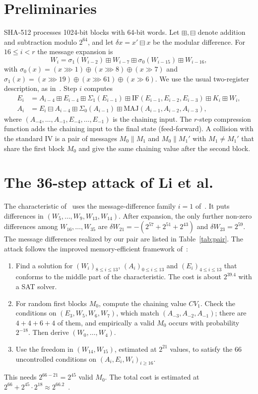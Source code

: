 \documentclass[11pt]{article}
\begin{document}
\section{Preliminaries}

SHA-512 processes 1024-bit blocks with 64-bit words. Let $\boxplus,\boxminus$ denote addition and subtraction modulo $2^{64}$, and let $\delta x = x'\boxminus x$ be the modular difference. For $16\le i<r$ the message expansion is
\[
W_i = \sigma_1(W_{i-2}) \boxplus W_{i-7} \boxplus \sigma_0(W_{i-15}) \boxplus W_{i-16},
\]
with $\sigma_0(x)=(x\ggg 1)\oplus(x\ggg 8)\oplus(x\gg 7)$ and $\sigma_1(x)=(x\ggg 19)\oplus(x\ggg 61)\oplus(x\gg 6)$. We use the usual two-register description, as in~\cite{LZLLQZ26}. Step $i$ computes
\begin{align*}
E_i &= A_{i-4} \boxplus E_{i-4} \boxplus \Sigma_1(E_{i-1}) \boxplus \mathrm{IF}(E_{i-1},E_{i-2},E_{i-3}) \boxplus K_i \boxplus W_i,\\
A_i &= E_i \boxminus A_{i-4} \boxplus \Sigma_0(A_{i-1}) \boxplus \mathrm{MAJ}(A_{i-1},A_{i-2},A_{i-3}),
\end{align*}
where $(A_{-4},\dots,A_{-1},E_{-4},\dots,E_{-1})$ is the chaining input. The $r$-step compression function adds the chaining input to the final state (feed-forward). A collision with the standard IV is a pair of messages $M_0\|M_1$ and $M_0\|M_1'$ with $M_1\neq M_1'$ that share the first block $M_0$ and give the same chaining value after the second block.

\section{The 36-step attack of Li et al.}\label{sec:prior}

The characteristic of~\cite[Tables~12--13]{LZLLQZ26} uses the message-difference family $i=1$ of~\cite{LLWS26}. It puts differences in $(W_5,\dots,W_9,W_{13},W_{14})$. After expansion, the only further non-zero differences among $W_{16},\dots,W_{35}$ are $\delta W_{21}=-(2^{57}+2^{51}+2^{43})$ and $\delta W_{23}=2^{59}$. The message differences realized by our pair are listed in Table~\ref{tab:pair}. The attack follows the improved memory-efficient framework of~\cite{LLWS26}:
\begin{enumerate}
\item Find a solution for $(W_i)_{8\le i\le 13}$, $(A_i)_{0\le i\le 13}$ and $(E_i)_{4\le i\le 13}$ that conforms to the middle part of the characteristic. The cost is about $2^{39.4}$ with a SAT solver.
\item For random first blocks $M_0$, compute the chaining value $\mathit{CV}_1$. Check the conditions on $(E_3,W_5,W_6,W_7)$, which match $(A_{-3},A_{-2},A_{-1})$; there are $4+4+6+4$ of them, and empirically a valid $M_0$ occurs with probability $2^{-18}$. Then derive $(W_0,\dots,W_4)$.
\item Use the freedom in $(W_{14},W_{15})$, estimated at $2^{21}$ values, to satisfy the 66 uncontrolled conditions on $(A_i,E_i,W_i)_{i\ge 16}$.
\end{enumerate}
This needs $2^{66-21}=2^{45}$ valid $M_0$. The total cost is estimated at $2^{66}+2^{45}\cdot 2^{18}\approx 2^{66.2}$~\cite{LZLLQZ26}.
\end{document}
